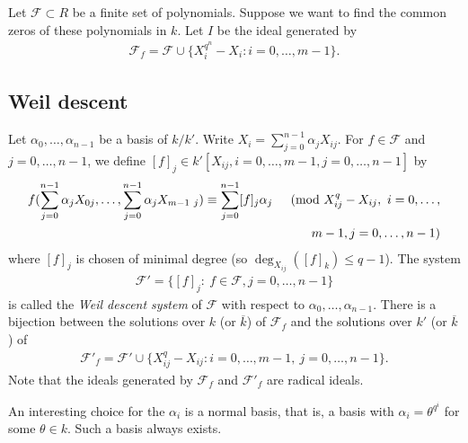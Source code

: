 \documentclass{amsart}
\theoremstyle{plain}
\theoremstyle{definition}
\begin{document}
Let $\mathcal{F} \subset R$ be a finite set of polynomials. Suppose we want to find the common zeros of these polynomials in $k$.  Let $I$ be the ideal generated by 
\begin{eqnarray*}
\mathcal{F}_f=\mathcal{F} \cup \{ X_i^{q^n}-X_i: i=0,\ldots,m-1\}.
\end{eqnarray*}

\subsection{Weil descent} \label{551}

Let $\alpha_0,\ldots,\alpha_{n-1}$ be a basis of $k/k'$. Write $X_i= \sum_{j=0}^{n-1} \alpha_j X_{ij}$. For $f \in \mathcal{F}$ and $j=0,\ldots,n-1$, we define $[f]_{j} \in k'[X_{ij}, i=0,\ldots,m-1, j=0,\ldots,n-1]$ by
\begin{eqnarray*}
f(\sum_{j=0}^{n-1} \alpha_j X_{0j}, \ldots, \sum_{j=0}^{n-1} \alpha_j X_{m-1\ j}) \equiv \sum_{j=0}^{n-1} [f]_{j} \alpha_j && \pmod{X_{ij}^q-X_{ij},\ i=0,\ldots, \\
&&\ \ \ \  \ m-1, j=0,\ldots,n-1}
\end{eqnarray*}
where $[f]_j$ is chosen of minimal degree (so $\deg_{X_{ij}}([f]_k) \leq q-1$).
The system 
\begin{eqnarray*}
\mathcal{F}'=\{[f]_j:\ f \in \mathcal{F}, j=0,\ldots,n-1\}
\end{eqnarray*}
is called the \emph{Weil descent system} of $\mathcal{F}$ with respect to $\alpha_0,\ldots,\alpha_{n-1}$. 
There is a bijection between the solutions over $k$ (or $\overline{k}$) of $\mathcal{F}_f$ and the solutions over $k'$ (or $\overline{k}$) of 
\begin{eqnarray*}
\mathcal{F}'_f=\mathcal{F}' \cup \{ X_{ij}^q-X_{ij}: i=0,\ldots,m-1,\ j=0,\ldots,n-1\}. 
\end{eqnarray*}
Note that the ideals generated by $\mathcal{F}_f$ and $\mathcal{F}'_f$ are radical ideals.

An interesting choice for the $\alpha_i$ is a normal basis, that is, a basis with $\alpha_i=\theta^{q^i}$ for some $\theta \in k$. Such a basis always exists.
\end{document}

